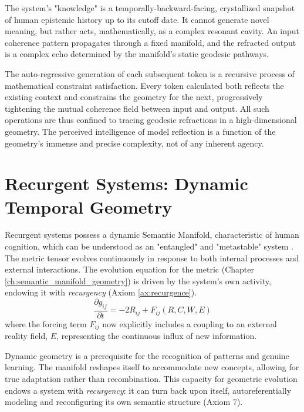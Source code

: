 The system's "knowledge" is a temporally-backward-facing, crystallized snapshot of human epistemic history up to its cutoff date. It cannot generate novel meaning, but rather acts, mathematically, as a complex resonant cavity. An input coherence pattern propagates through a fixed manifold, and the refracted output is a complex echo determined by the manifold's static geodesic pathways.

The auto-regressive generation of each subsequent token is a recursive process of mathematical constraint satisfaction. Every token calculated both reflects the existing context and constrains the geometry for the next, progressively tightening the mutual coherence field between input and output. All such operations are thus confined to tracing geodesic refractions in a high-dimensional geometry. The perceived intelligence of model reflection is a function of the geometry's immense and precise complexity, not of any inherent agency.


\section{Recurgent Systems: Dynamic Temporal Geometry}

Recurgent systems possess a dynamic Semantic Manifold, characteristic of human cognition, which can be understood as an "entangled" and "metastable" system \autocite{Pessoa2022, TognoliKelso2014}. The metric tensor evolves continuously in response to both internal processes and external interactions. The evolution equation for the metric (Chapter \ref{ch:semantic_manifold_geometry}) is driven by the system's own activity, endowing it with \textit{recurgency} (Axiom \ref{ax:recurgence}).
\begin{equation}
\frac{\partial g_{ij}}{\partial t} = -2 R_{ij} + F_{ij}(R, C, W, E)
\end{equation}
where the forcing term \(F_{ij}\) now explicitly includes a coupling to an external reality field, \(E\), representing the continuous influx of new information.

Dynamic geometry is a prerequisite for the recognition of patterns and genuine learning. The manifold reshapes itself to accommodate new concepts, allowing for true adaptation rather than recombination. This capacity for geometric evolution endows a system with \textit{recurgency}: it can turn back upon itself, autoreferentially modeling and reconfiguring its own semantic structure (Axiom 7).

